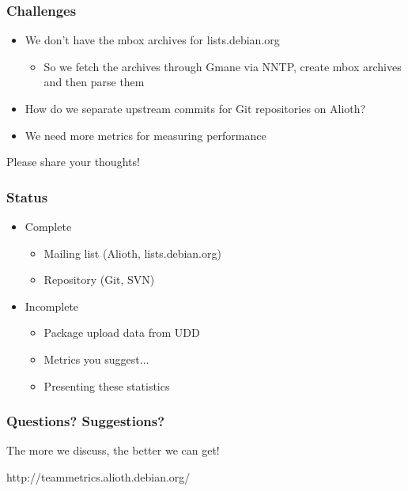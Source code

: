 \documentclass[compress]{beamer}
\begin{document}
\begin{frame}
    \frametitle{Challenges}
    \begin{itemize}
    \item We don't have the mbox archives for lists.debian.org
        \begin{itemize}
        \pause
        \item So we fetch the archives through Gmane via NNTP, create mbox archives and then parse them
        \end{itemize}
    \pause
    \item How do we separate upstream commits for Git repositories on Alioth?
    \pause
    \item We need more metrics for measuring performance
    \pause
    \end{itemize}
    \center Please share your thoughts! 
\end{frame}

\begin{frame}
    \frametitle{Status}
    \begin{itemize}
        \item Complete
        \begin{itemize}
            \item Mailing list (Alioth, lists.debian.org)
            \item Repository (Git, SVN)
        \end{itemize}
    \end{itemize}

    \begin{itemize}
        \item Incomplete
        \begin{itemize}
            \item Package upload data from UDD
            \item Metrics you suggest...
            \item Presenting these statistics
        \end{itemize}
    \end{itemize}
\end{frame}

\begin{frame}
    \frametitle{Questions? Suggestions?}
    \begin{center}
    The more we discuss, the better we can get!
    \end{center}
    \begin{center}
    http://teammetrics.alioth.debian.org/
    \end{center}
\end{frame}
\end{document}
